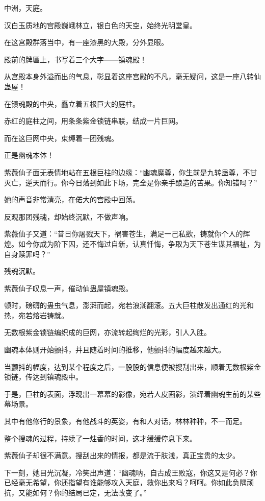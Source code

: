 
\begin{this_body}

中洲，天庭。

汉白玉质地的宫殿巍峨林立，银白色的天空，始终光明堂皇。

在这宫殿群落当中，有一座漆黑的大殿，分外显眼。

殿前的牌匾上，书写着三个大字——镇魂殿！

从宫殿本身外溢而出的气息，彰显着这座宫殿的不凡，毫无疑问，这是一座八转仙蛊屋！

在镇魂殿的中央，矗立着五根巨大的庭柱。

赤红的庭柱之间，用条条紫金锁链串联，结成一片巨网。

而在这巨网中央，束缚着一团残魂。

正是幽魂本体！

紫薇仙子面无表情地站在五根巨柱的边缘：“幽魂魔尊，你生前是九转蛊尊，不甘灭亡，逆天而行。你今日落到如此下场，完全是你亲手酿造的苦果。你知错吗？”

她的声音非常清亮，在偌大的宫殿中回荡。

反观那团残魂，却始终沉默，不做声响。

紫薇仙子又道：“昔日你屠戮天下，祸害苍生，满足一己私欲，铸就你个人的辉煌。如今你成为阶下囚，还不悔过自新，认真忏悔，争取为天下苍生谋其福祉，为自身赎罪吗？”

残魂沉默。

紫薇仙子叹息一声，催动仙蛊屋镇魂殿。

顿时，磅礴的蛊虫气息，澎湃而起，宛若浪潮翻滚。五大巨柱散发出通红的光和热，宛若熔岩铸就。

无数根紫金锁链编织成的巨网，亦流转起绚烂的光彩，引人入胜。

幽魂本体则开始颤抖，并且随着时间的推移，他颤抖的幅度越来越大。

当颤抖的幅度，达到某个程度之后，一股股的信息便被搜刮出来，顺着无数根紫金锁链，传达到镇魂殿中。

于是，巨柱的表面，浮现出一幕幕的影像，宛若人皮画影，演绎着幽魂生前的某些幕场景。

其中有他修行的景象，有他战斗的英姿，有和人对话，林林种种，不一而足。

整个搜魂的过程，持续了一炷香的时间，这才缓缓停息下来。

紫薇仙子却很不满意。搜刮出来的情报，都是流于肤浅，真正宝贵的太少。

下一刻，她目光沉凝，冷笑出声道：“幽魂呐，自古成王败寇，你这又是何必？你已经毫无希望，你还指望有谁能够攻入天庭，救你出来吗？呵呵。你如此负隅顽抗，又能如何？你的结局已定，无法改变了。”


\end{this_body}
